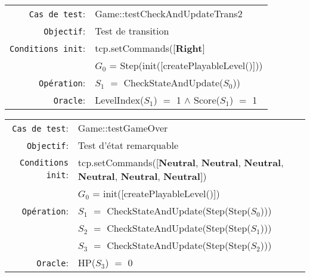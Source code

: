 \documentclass{article}
\begin{document}
{\small
  \begin{longtable}{rl}
    \texttt{Cas de test}: &\textrm{Game::testCheckAndUpdateTrans2}\\
    \texttt{Objectif}: & Test de transition\\
    \texttt{Conditions init}: & \textrm{tcp.setCommands([\textbf{Right}]}\\
    & $G_0$ = \textrm{Step(init([createPlayableLevel()]))}\\
    \texttt{Opération}: &$S_1$ $=$ \textrm{CheckStateAndUpdate($S_0$))}\\
    \texttt{Oracle}: &\textrm{LevelIndex($S_1$)} $=$ 1 $\land$ \textrm{Score($S_1$)} $=$ 1\\
  \end{longtable}}

{\small
  \begin{longtable}{rl}
    \texttt{Cas de test}: &\textrm{Game::testGameOver}\\
    \texttt{Objectif}: & Test d'état remarquable \\
    \texttt{Conditions init}: & \textrm{tcp.setCommands([\textbf{Neutral}, \textbf{Neutral}, \textbf{Neutral}, \textbf{Neutral}, \textbf{Neutral}, \textbf{Neutral}])}\\
    & $G_0$ = \textrm{init([createPlayableLevel()])}\\
    \texttt{Opération}: &$S_1$ $=$ \textrm{CheckStateAndUpdate(Step(Step($S_0$)))}\\
    &$S_2$ $=$ \textrm{CheckStateAndUpdate(Step(Step($S_1$)))}\\
    &$S_3$ $=$ \textrm{CheckStateAndUpdate(Step(Step($S_2$)))}\\
    \texttt{Oracle}: &\textrm{HP($S_3$)} $=$ 0\\
  \end{longtable}}
\end{document}
